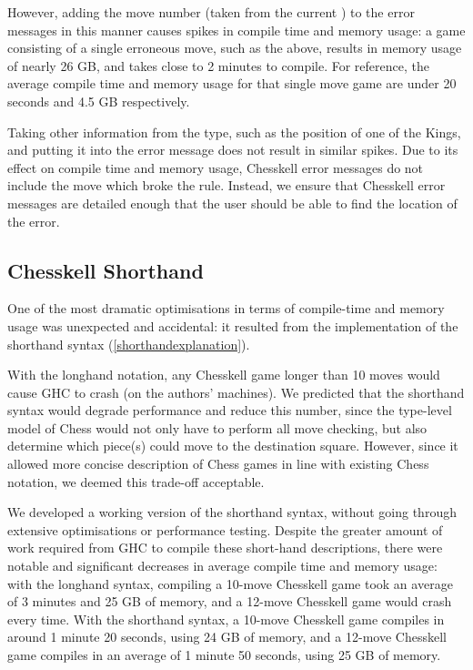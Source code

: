 However, adding the move number (taken from the current ) to the error messages in this manner causes spikes in compile time and memory usage: a game consisting of a single erroneous move, such as the above, results in memory usage of nearly 26 GB, and takes close to 2 minutes to compile. For reference, the average compile time and memory usage for that single move game are under 20 seconds and 4.5 GB respectively.

Taking other information from the  type, such as the position of one of the Kings, and putting it into the error message does not result in similar spikes. Due to its effect on compile time and memory usage, Chesskell error messages do not include the move which broke the rule. Instead, we ensure that Chesskell error messages are detailed enough that the user should be able to find the location of the error.

\subsection{Chesskell Shorthand} \label{shorthand}

One of the most dramatic optimisations in terms of compile-time and memory usage was unexpected and accidental: it resulted from the implementation of the shorthand syntax (\cref{shorthandexplanation}).

With the longhand notation, any Chesskell game longer than 10 moves would cause GHC to crash (on the authors' machines). We predicted that the shorthand syntax would degrade performance and reduce this number, since the type-level model of Chess would not only have to perform all move checking, but also determine which piece(s) could move to the destination square. However, since it allowed more concise description of Chess games in line with existing Chess notation, we deemed this trade-off acceptable.

We developed a working version of the shorthand syntax, without going through extensive optimisations or performance testing. Despite the greater amount of work required from GHC to compile these short-hand descriptions, there were notable and significant decreases in average compile time and memory usage: with the longhand syntax, compiling a 10-move Chesskell game took an average of 3 minutes and 25 GB of memory, and a 12-move Chesskell game would crash every time. With the shorthand syntax, a 10-move Chesskell game compiles in around 1 minute 20 seconds, using 24 GB of memory, and a 12-move Chesskell game compiles in an average of 1 minute 50 seconds, using 25 GB of memory.

